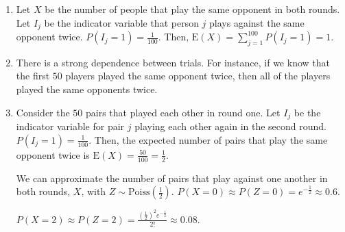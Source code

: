 \begin{enumerate}[label=(\alph*)]
\item Let $X$ be the number of people that play the same opponent in both
rounds. Let $I_{j}$ be the indicator variable that person $j$ plays against the
same opponent twice. $P(I_{j}=1) = \frac{1}{100}$. Then, $\text{E}(X) = \sum_
{j=1}^{100}P(I_{j}=1) = 1$.

\item There is a strong dependence between trials. For instance, if we know that
the first $50$ players played the same opponent twice, then all of the players
played the same opponents twice.

\item Consider the $50$ pairs that played each other in round one. Let $I_{j}$
be the indicator variable for pair $j$ playing each other again in the second
round. $P(I_{j}=1) = \frac{1}{100}$. Then, the expected number of pairs that
play the same opponent twice is $\text{E}(X) = \frac{50}{100} = \frac{1}{2}$.

We can approximate the number of pairs that play against one another in both
rounds, $X$,  with $Z \sim \text{Poiss}(\frac{1}{2})$. $P(X = 0) \approx P(Z =
0) = e^{-\frac{1}{2}} \approx 0.6$.

$P(X = 2) \approx P(Z = 2) = \frac{(\frac{1}{2})^{2}e^{-\frac{1}{2}}}{2!}
\approx 0.08$.
\end{enumerate}